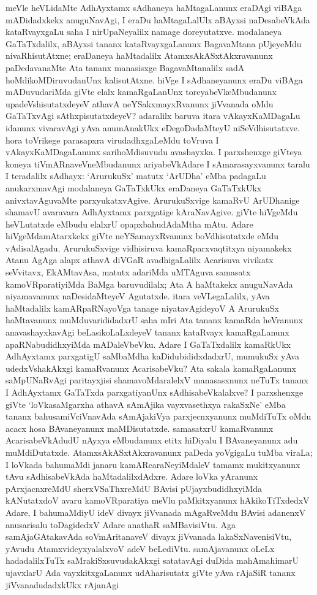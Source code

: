 meVle heVLidaMte AdhAyxtamx sAdhaneya haMtagaLanunx eraDAgi viBAga mADidadxkekx anuguNavAgi, I eraDu haMtagaLalUlx aBAyxsi naDesabeVkAda kataRvayxgaLu saha I nirUpaNeyalilx namage doreyutatxve. modalaneya GaTaTxdalilx, aBAyxsi tananx kataRvayx\-gaLanunx BagavaMtana pUjeyeMdu nivaRhisutAtxne; eraDaneya haMtadalilx AtamxsAkASx\-tAkxravanunx paDedavanaMte Ata tananx manasisxge BagavaMtanalilx sadA hoMdikoMDiru\-vudanUnx kalisutAtxne. hiVge I sAdhaneyanunx eraDu viBAga mADuvudariMda giVte elalx kamaRgaLanUnx toreyabeVkeMbudanunx upadeVshisutatxdeyeV athavA neYSakxmayxRvanunx jiVvanada oMdu GaTaTxvAgi sAthxpisutatxdeyeV? adaralilx baruva itara vAkayxKaMDagaLu idanunx vivaravAgi yAva anumAnakUkx eDegoDadaMteyU niSeVdhisutatxve. hora toVrikege parasapxra virudadhxgaLeMdu toVruva I vAkayxKaMDagaLanunx sarihoMdisuvudu avashayxka. I parxshenxge giVteya koneya tiVmARnaveVneMbudanunx ariyabeVkAdare I sAmarasayxvanunx taralu I teradalilx sAdhayx: `ArurukuSx' matutx `ArUDha' eMba padagaLu anukarxmavAgi modalaneya GaTaTxkUkx eraDaneya GaTaTxkUkx anivxtavAguvaMte parxyukatxvAgive. ArurukuSxvige kamaRvU ArUDhanige shamavU avaravara AdhAyxtamx parxgatige kAraNavAgive. giVte hiVgeMdu heVLutatxde eMbudu elalxrU opapxbahudAdaMtha mAtu. Adare hiVgeMdamAtarxkekx giVte neYSamayxRvanunx boVdhisutatxde eMdu vAdisalAgadu. ArurukuSxvige vidhisiruva kamaRparxvaqtitxya niyamakekx Atanu AgAga alapx athavA diVGaR avadhigaLalilx Acarisuva vivikatx seVvitavx, EkAMtavAsa, matutx adariMda uMTAguva samasatx kamoVRparatiyiMda BaMga baruvudilalx; Ata A haMtakekx anuguNavAda niyamavanunx naDesidaMteyeV Agutatxde. itara veVLegaLalilx, yAva haMtadalilx kamARpaRNayoVga tanage niyatavAgideyoV A ArurukuSx haMtavanunx muMduvarididadxrU saha mIri Ata tananx kamaRda heVranunx anavashayxkavAgi beLasikoLaLxdeyeV tananx kataRvayx kamaRgaLanunx apaRNabudidhxyiMda mADaleVbeVku. Adare I GaTaTxdalilx kamaRkUkx AdhAyxtamx parxgatigU saMbaMdha kaDidubididxdadxrU, mumukuSx yAva udedxVshakAkxgi kamaRvanunx AcarisabeVku? Ata sakala kamaRgaLanunx saMpUNaRvAgi paritayxjisi shamavoMdaralelxV manasasxnunx neTuTx tananx I AdhAyxtamx GaTaTxda parxgatiyanUnx sAdhisabeVkalalxve? I parxshenxge giVte `loVkasaMgarxha athavA sAmAjika vayxvasethxya rakaSxNe' eMba tananx bahusamiVciVnavAda sAmAjakiVya parxjecnxyanunx muMdiTuTx oMdu acacx hosa BAvaneyanunx maMDisutatxde. samasatxrU kamaRvanunx AcarisabeVkAdudU nAyxya eMbudanunx etitx hiDiyalu I BAvaneyanunx adu muMdiDutatxde. AtamxsAkASxtAkxravanunx paDeda yoVgigaLu tuMba viraLa; I loVkada bahumaMdi janaru kamARcaraNeyiMdaleV tamamx mukitxyanunx tAvu sAdhisabeVkAda haMtadalilxdAdxre. Adare loVka yAranunx pArxjacnxreMdU sherxVSaThxreMdU BAvisi pUjayxbudidhxyiMda kANutatxdoV avaru kamoVRparatiya meVlu paMkitxyanunx hAkikoTiTxdedxV Adare, I bahumaMdiyU ideV divayx jiVvanada mAgaRveMdu BAvisi adanenxV anusarisalu toDagidedxV Adare anathaR saMBavisiVtu. Aga samAjaGAtakavAda soVmAritanaveV divayx jiVvanada lakaSxNavenisiVtu, yAvudu AtamxvideyxyalalxvoV adeV beLediVtu. samAjavanunx oLeLx hadadalilxTuTx saMrakiSxsuvudakAkxgi satatavAgi duDida mahAmahimarU ujavxlarU Ada vayxkitxgaLanunx udAharisutatx giVte yAva rAjaSiR tananx jiVvanadudadxkUkx rAjanAgi 